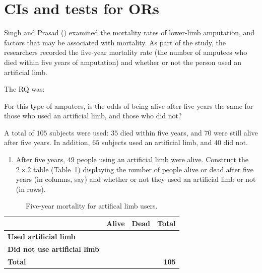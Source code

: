 \documentclass[
  11pt,
  a4paper,
  krantz2]{krantz}
\makeatletter
\providecommand{\tightlist}{%
  \setlength{\itemsep}{0pt}\setlength{\parskip}{0pt}}
\renewenvironment{quote}%
{\begin{kframe}}
{\end{kframe}}
\newenvironment{kframe}{%
\medskip{}
\setlength{\fboxsep}{.8em}
 \def\at@end@of@kframe{}%
 \ifinner\ifhmode%
  \def\at@end@of@kframe{\end{minipage}}%
  \begin{minipage}{\columnwidth}%
 \fi\fi%
 \def\FrameCommand##1{\hskip\@totalleftmargin \hskip-\fboxsep
 \colorbox{shadecolor}{##1}\hskip-\fboxsep
     \hskip-\linewidth \hskip-\@totalleftmargin \hskip\columnwidth}%
 \MakeFramed {\advance\hsize-\width
   \@totalleftmargin\z@ \linewidth\hsize
   \@setminipage}}%
 {\par\unskip\endMakeFramed%
 \at@end@of@kframe}
\renewenvironment{quote}
               {\list{}{\vspace{-0.5em}\begin{kframe}\small%
                        \rightmargin   \leftmargin
                        \parsep        \z@ \@plus\p@}%
                \item\relax}
               {\end{kframe}\endlist}
\makeatother
\begin{document}
\section{CIs and tests for ORs}\label{TestsForORs}

Singh and Prasad () examined the mortality rates of lower-limb amputation, and factors that may be associated with mortality.
As part of the study, the researchers recorded the five-year mortality rate (the number of amputees who died within five years of amputation) and whether or not the person used an artificial limb.

The RQ was:

\begin{quote}
For this type of amputees, is the odds of being alive after five years the same for those who used an artificial limb, and those who did not?
\end{quote}

A total of \(105\) subjects were used: \(35\) died within five years, and \(70\) were still alive after five years.
In addition, \(65\) subjects used an artificial limb, and \(40\) did not.

\begin{enumerate}
\def\labelenumi{\arabic{enumi}.}
\tightlist
\item
  After five years, \(49\) people using an artificial limb were alive.
  Construct the \(2\times 2\) table (Table~\ref{tab:ArtLimbMortality}) displaying the number of people alive or dead after five years (in columns, say) and whether or not they used an artificial limb or not (in rows).
\end{enumerate}

\begin{table}
\centering
\caption{\label{tab:ArtLimbMortality}Five-year mortality for artifical limb users.}
\centering
\fontsize{10}{12}\selectfont
\begin{tabular}[t]{>{}lrrr}
\toprule
\textbf{ } & \textbf{Alive} & \textbf{Dead} & \textbf{Total}\\
\midrule
\textbf{Used artificial limb} &  &  & \\
\addlinespace
\textbf{Did not use artificial limb} &  &  & \\
\midrule
\addlinespace
\textbf{\textbf{Total}} & \textbf{} & \textbf{} & \textbf{105}\\
\bottomrule
\end{tabular}
\end{table}
\end{document}
